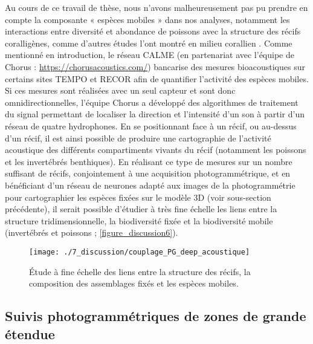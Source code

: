 Au cours de ce travail de thèse, nous n’avons malheureusement pas pu prendre en compte la composante « espèces mobiles » dans nos analyses, notamment les interactions entre diversité et abondance de poissons avec la structure des récifs coralligènes, comme d’autres études l’ont montré en milieu corallien \citep{willis_habitat_2005, graham_importance_2013, darling_relationships_2017, price_using_2019}. Comme mentionné en introduction, le réseau CALME (en partenariat avec l’équipe de Chorus : \href{https://chorusacoustics.com/}{https://chorusacoustics.com/}) bancarise des mesures bioacoustiques sur certains sites TEMPO et RECOR afin de quantifier l’activité des espèces mobiles. Si ces mesures sont réalisées avec un seul capteur et sont donc omnidirectionnelles, l’équipe Chorus a développé des algorithmes de traitement du signal permettant de localiser la direction et l’intensité d’un son à partir d’un réseau de quatre hydrophones. En se positionnant face à un récif, ou au-dessus d’un récif, il est ainsi possible de produire une cartographie de l’activité acoustique des différents compartiments vivants du récif (notamment les poissons et les invertébrés benthiques). En réalisant ce type de mesures sur un nombre suffisant de récifs, conjointement à une acquisition photogrammétrique, et en bénéficiant d’un réseau de neurones adapté aux images de la photogrammétrie pour cartographier les espèces fixées sur le modèle 3D (voir sous-section précédente), il serait possible d’étudier à très fine échelle les liens entre la structure tridimensionnelle, la biodiversité fixée et la biodiversité mobile (invertébrés et poissons ; \autoref{figure_discussion6}).

\begin{figure}[H]
	\begin{center}
	\texttt{[image: ./7\_discussion/couplage\_PG\_deep\_acoustique]}
		\caption{Étude à fine échelle des liens entre la structure des récifs, la composition des assemblages fixés et les espèces mobiles.}
	\label{figure_discussion6}
\end{center}
\end{figure}

\subsection{Suivis photogrammétriques de zones de grande étendue}

